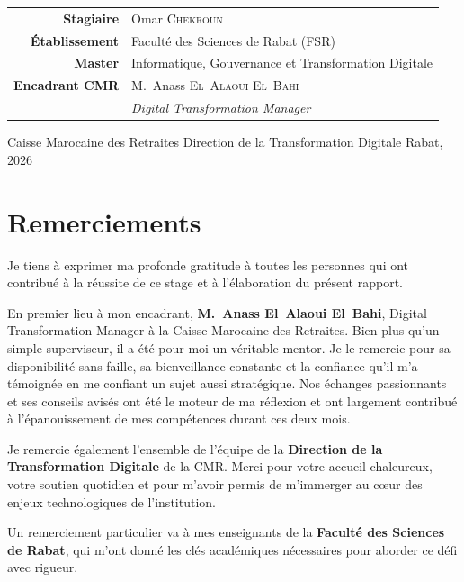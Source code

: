 \documentclass[12pt, a4paper]{report}
\begin{document}
\begin{titlepage}
\begin{tabular}{>{\color{primary}\bfseries}r @{\hspace{0.6em}:\hspace{0.8em}} l}
Stagiaire
  & Omar \textsc{Chekroun} \\

Établissement
  & Faculté des Sciences de Rabat (FSR) \\

Master
  & Informatique, Gouvernance et Transformation Digitale \\

Encadrant CMR
  & M.~Anass \textsc{El~Alaoui El~Bahi} \\
  & \small\itshape Digital Transformation Manager \\
\end{tabular}

  \vfill
  {\small\color{primary}
    Caisse Marocaine des Retraites \textbullet{}
    Direction de la Transformation Digitale \textbullet{}
    Rabat, 2026}
\end{titlepage}

\newpage
\thispagestyle{plain}
\chapter*{Remerciements}

Je tiens à exprimer ma profonde gratitude à toutes les personnes qui ont
contribué à la réussite de ce stage et à l'élaboration du présent rapport.

En premier lieu à mon encadrant, \textbf{M.~Anass El~Alaoui El~Bahi}, Digital Transformation Manager à la Caisse Marocaine des Retraites. Bien plus qu'un simple superviseur, il a été pour moi un véritable mentor. Je le remercie pour sa disponibilité sans faille, sa bienveillance constante et la confiance qu'il m'a témoignée en me confiant un sujet aussi stratégique. Nos échanges passionnants et ses conseils avisés ont été le moteur de ma réflexion et ont largement contribué à l'épanouissement de mes compétences durant ces deux mois.

Je remercie également l'ensemble de l'équipe de la \textbf{Direction de la Transformation Digitale} de la CMR. Merci pour votre accueil chaleureux, votre soutien quotidien et pour m'avoir permis de m'immerger au cœur des enjeux technologiques de l'institution.

Un remerciement particulier va à mes enseignants de la \textbf{Faculté des Sciences de Rabat}, qui m'ont donné les clés académiques nécessaires pour aborder ce défi avec rigueur.
\end{document}
